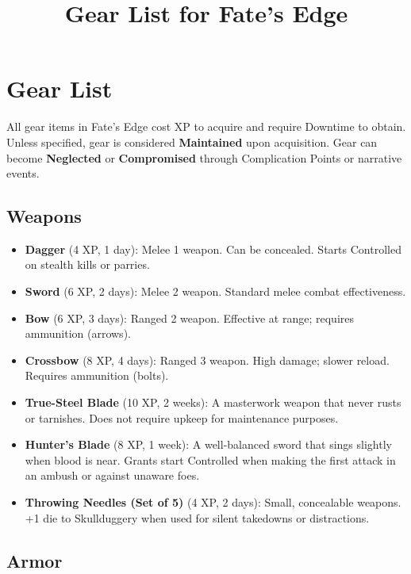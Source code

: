\documentclass[12pt]{article}
\title{Gear List for Fate's Edge}
\author{}
\date{}
\begin{document}
\maketitle

\section*{Gear List}

All gear items in Fate's Edge cost XP to acquire and require Downtime to obtain. Unless specified, gear is considered \textbf{Maintained} upon acquisition. Gear can become \textbf{Neglected} or \textbf{Compromised} through Complication Points or narrative events.

\subsection*{Weapons}

\begin{itemize}[leftmargin=*]
  \item \textbf{Dagger} (4 XP, 1 day): Melee 1 weapon. Can be concealed. Starts Controlled on stealth kills or parries.
  \item \textbf{Sword} (6 XP, 2 days): Melee 2 weapon. Standard melee combat effectiveness.
  \item \textbf{Bow} (6 XP, 3 days): Ranged 2 weapon. Effective at range; requires ammunition (arrows).
  \item \textbf{Crossbow} (8 XP, 4 days): Ranged 3 weapon. High damage; slower reload. Requires ammunition (bolts).
  \item \textbf{True-Steel Blade} (10 XP, 2 weeks): A masterwork weapon that never rusts or tarnishes. Does not require upkeep for maintenance purposes.
  \item \textbf{Hunter's Blade} (8 XP, 1 week): A well-balanced sword that sings slightly when blood is near. Grants start Controlled when making the first attack in an ambush or against unaware foes.
  \item \textbf{Throwing Needles (Set of 5)} (4 XP, 2 days): Small, concealable weapons. +1 die to Skullduggery when used for silent takedowns or distractions.
\end{itemize}

\subsection*{Armor}
\end{document}
